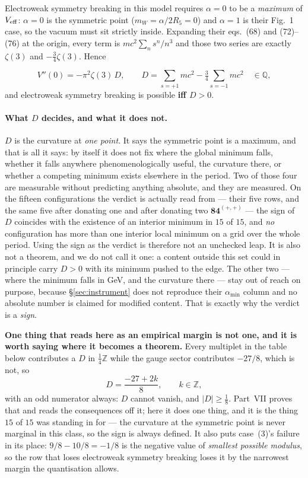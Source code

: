 \documentclass[11pt,a4paper]{article}
\newcommand{\ZZ}{\mathbb{Z}}
\newcommand{\rep}[1]{\mathbf{#1}}
\newcommand{\amin}{\alpha_{\min}}
\newenvironment{keyeq}
  {\begin{center}\setlength{\fboxsep}{9pt}\setlength{\fboxrule}{0.8pt}%
   \begin{lrbox}{\keyeqbox}\begin{minipage}{0.88\textwidth}}
  {\end{minipage}\end{lrbox}%
   \fcolorbox{hdrblue!55}{hdrblue!6}{\usebox{\keyeqbox}}\end{center}}
\begin{document}
Electroweak symmetry breaking in this model requires $\alpha=0$ to be a \emph{maximum} of
$V_{\rm eff}$: $\alpha=0$ is the symmetric point ($m_W=\alpha/2R_5=0$) and $\alpha=1$ is their
Fig.~1 case, so the vacuum must sit strictly inside. Expanding their eqs.~(68) and (72)--(76) at
the origin, every term is $m c^2\sum_n s^n/n^3$ and those two series are exactly $\zeta(3)$ and
$-\tfrac34\zeta(3)$. Hence

\begin{keyeq}
\[
V''(0)=-\pi^2\zeta(3)\,D,\qquad
D=\sum_{s=+1}m c^2-\tfrac34\sum_{s=-1}m c^2\quad\in\mathbb{Q},
\]
and electroweak symmetry breaking is possible \textbf{iff $D>0$}.
\end{keyeq}

\paragraph{What $D$ decides, and what it does not.} $D$ is the curvature at \emph{one point}. It says
the symmetric point is a maximum, and that is all it says: by itself it does not fix where the global
minimum falls, whether it falls anywhere phenomenologically useful, the curvature there, or whether a
competing minimum exists elsewhere in the period. Two of those four are measurable without predicting
anything absolute, and they are measured. On the fifteen configurations the verdict is actually read
from --- their five rows, and the same five after donating one and after donating two
$\rep{84}^{(+,+)}$ --- the sign of $D$ coincides with the existence of an interior minimum in
$15$ of $15$, and \emph{no} configuration has more than one interior local minimum on a grid over the
whole period. Using the sign as the verdict is therefore not an unchecked leap. It is also not a
theorem, and we do not call it one: a content outside this set could in principle carry $D>0$ with
its minimum pushed to the edge. The other two --- where the minimum falls in GeV, and the curvature
there --- stay out of reach on purpose, because \S\ref{sec:instrument} does not reproduce their
$\amin$ column and no absolute number is claimed for modified content. That is exactly why the
verdict is a \emph{sign}.

\textbf{One thing that reads here as an empirical margin is not one, and it is worth saying where it
becomes a theorem.} Every multiplet in the table below contributes a $D$ in $\tfrac14\ZZ$ while the
gauge sector contributes $-27/8$, which is not, so
\[
  D=\frac{-27+2k}{8},\qquad k\in\ZZ,
\]
with an odd numerator always: $D$ cannot vanish, and $|D|\ge\tfrac18$. Part~VII \cite{PartVII} proves
that and reads the consequences off it; here it does one thing, and it is the thing $15$ of $15$ was
standing in for --- the curvature at the symmetric point is never marginal in this class, so the sign
is always defined. It also puts case~(3)'s failure in its place: $9/8-10/8=-1/8$ is the negative
value of \emph{smallest possible modulus}, so the row that loses electroweak symmetry breaking loses
it by the narrowest margin the quantisation allows.
\end{document}
